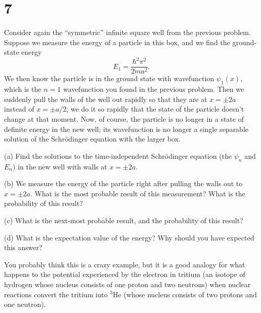 \documentclass{article}
\begin{document}
\section*{7}
\begin{ques}\label{q7}
Consider again the “symmetric” infinite square well from the previous problem. Suppose
we measure the energy of a particle in this box, and we find the ground-state energy
\[
E_1 = \frac{\hbar^2\pi^2}{2ma^2}.
\]
We then know the particle is in the ground state with wavefunction $\psi_1(x)$,
which is the $n = 1$ wavefunction you found in the previous problem. Then we suddenly
pull the walls of the well out rapidly so that they are at $x = \pm 2a$ instead of $x = \pm a/2$; we do
it so rapidly that the state of the particle doesn’t change at that moment. Now, of course,
the particle is no longer in a state of definite energy in the new well; its wavefunction is no
longer a single separable solution of the Schrödinger equation with the larger box.

(a) Find the solutions to the time-independent Schrödinger equation (the $\psi_n$ and $E_n$) in
the new well with walls at $x = \pm 2a$.

(b) We measure the energy of the particle right after pulling the walls out to $x = \pm 2a$.
What is the most probable result of this measurement? What is the probability of
this result?

(c) What is the next-most probable result, and the probability of this result?

(d) What is the expectation value of the energy? Why should you have expected this
answer?

You probably think this is a crazy example, but it is a good analogy for what happens to
the potential experienced by the electron in tritium (an isotope of hydrogen whose nucleus
consists of one proton and two neutrons) when nuclear reactions convert the tritium into
${}^3$He (whose nucleus consists of two protons and one neutron).
\end{ques}
\end{document}

